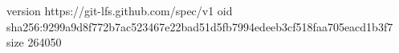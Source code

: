 version https://git-lfs.github.com/spec/v1
oid sha256:9299a9d8f772b7ac523467e22bad51d5fb7994edeeb3cf518faa705eacd1b3f7
size 264050
